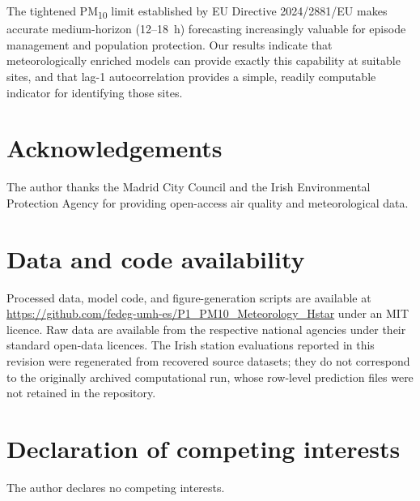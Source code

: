 \documentclass[12pt,a4paper]{article}
\newcommand{\PMten}{PM\textsubscript{10}}
\begin{document}
The tightened \PMten{} limit established by EU Directive 2024/2881/EU makes
accurate medium-horizon (12--18~h) forecasting increasingly valuable for
episode management and population protection.  Our results indicate that
meteorologically enriched models can provide exactly this capability at suitable
sites, and that lag-1 autocorrelation provides a simple, readily computable
indicator for identifying those sites.

\section*{Acknowledgements}

The author thanks the Madrid City Council and the Irish Environmental Protection
Agency for providing open-access air quality and meteorological data.

\section*{Data and code availability}

Processed data, model code, and figure-generation scripts are available at
\url{https://github.com/fedeg-umh-es/P1_PM10_Meteorology_Hstar} under an MIT licence.
Raw data are available from the respective national agencies under their
standard open-data licences. The Irish station evaluations reported in this revision were regenerated from recovered source datasets; they do not correspond to the originally archived computational run, whose row-level prediction files were not retained in the repository.

\section*{Declaration of competing interests}

The author declares no competing interests.

\end{document}
